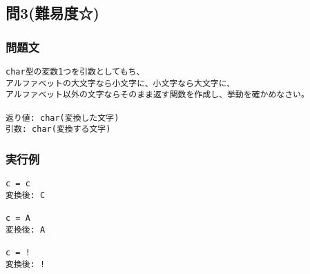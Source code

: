 \subsection{問3(難易度☆)}
\subsubsection{問題文}
\begin{verbatim}
char型の変数1つを引数としてもち、
アルファベットの大文字なら小文字に、小文字なら大文字に、
アルファベット以外の文字ならそのまま返す関数を作成し、挙動を確かめなさい。

返り値: char(変換した文字)
引数: char(変換する文字)
\end{verbatim}

\subsubsection{実行例}
\begin{verbatim}
c = c
変換後: C

c = A
変換後: A

c = !
変換後: !
\end{verbatim}

